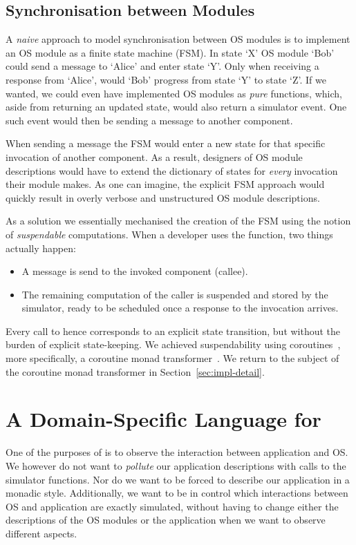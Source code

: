 \subsection{Synchronisation between Modules}
A \emph{naive} approach to model synchronisation between OS modules is to implement an OS module as a finite state machine (FSM).
In state `X' OS module `Bob' could send a message to `Alice' and enter state `Y'.
Only when receiving a response from `Alice', would `Bob' progress from state `Y' to state `Z'.
If we wanted, we could even have implemented OS modules as \emph{pure} functions, which, aside from returning an updated state, would also return a simulator event.
One such event would then be sending a message to another component.

When sending a message the FSM would enter a new state for that specific invocation of another component.
As a result, designers of OS module descriptions would have to extend the dictionary of states for \emph{every} invocation their module makes.
As one can imagine, the explicit FSM approach would quickly result in overly verbose and unstructured OS module descriptions.

As a solution we essentially mechanised the creation of the FSM using the notion of \emph{suspendable} computations.
When a developer uses the  function, two things actually happen:
\begin{itemize}
  \item A message is send to the invoked component (callee).
  \item The remaining computation of the caller is suspended and stored by the simulator, ready to be scheduled once a response to the invocation arrives.
\end{itemize}
Every call to  hence corresponds to an explicit state transition, but without the burden of explicit state-keeping.
We achieved suspendability using coroutines~\cite{coroutines}, more specifically, a coroutine monad transformer~\cite{cmt}.
We return to the subject of the coroutine monad transformer in Section~\ref{sec:impl-detail}.

\section{A Domain-Specific Language for \soosim}
\label{sec:dsl}
One of the purposes of \soosim is to observe the interaction between application and OS.
We however do not want to \emph{pollute} our application descriptions with calls to the simulator functions.
Nor do we want to be forced to describe our application in a monadic style.
Additionally, we want to be in control which interactions between OS and application are exactly simulated, without having to change either the descriptions of the OS modules or the application when we want to observe different aspects.

